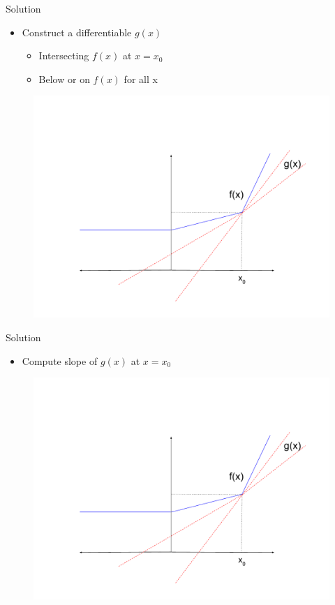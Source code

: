 \documentclass{beamer}
\begin{document}
\begin{frame}{Solution}

\begin{itemize}
\item Construct a differentiable $g(x)$ 
\begin{itemize}
    \item Intersecting $f(x)$ at $x = x_0$
    \item Below or on $f(x)$ for all x
\end{itemize}
\end{itemize}
\begin{figure}
    \centering
    \includegraphics[scale = 0.25]{subgradient_2.pdf}
    \label{fig:my_label}
\end{figure}
\end{frame}

\begin{frame}{Solution}

\begin{itemize}
\item Compute slope of $g(x)$ at $x = x_0$
\end{itemize}
\begin{figure}
    \centering
    \includegraphics[scale = 0.25]{subgradient_2.pdf}
    
    \label{fig:my_label}
\end{figure}
\end{frame}
\end{document}
